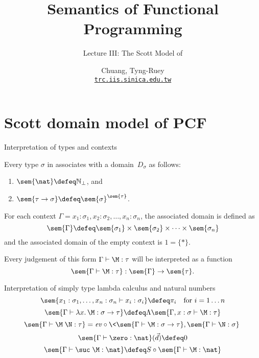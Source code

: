 \title{Semantics of Functional Programming}
\subtitle{Lecture III: The Scott Model of \PCF}
\author[T.-R. Chuang]{Chuang, Tyng-Ruey \\
  \href{mailto@trc.iis.sinica.edu.tw}{\texttt{trc.iis.sinica.edu.tw}}}

\frame{\maketitle}
\section{Scott domain model of PCF}  
\begin{frame}{Interpretation of types and contexts}
  \begin{definition}
  Every type $\sigma$ in \PCF{} associates with a domain~$D_\sigma$ as
  follows:

    \begin{enumerate}
      \item $\sem{\nat} \defeq \mathbb{N}_\bot$, and
      \item $\sem{\tau \to \sigma} \defeq \sem{\sigma}^{\sem{\tau}}$.
    \end{enumerate}
  \end{definition}
  \begin{definition}
    For each context $\Gamma = x_1 : \sigma_1, x_2 : \sigma_2,
    \dots, x_n : \sigma_n$, the associated domain is defined as
    \[
      \sem{\Gamma} \defeq \sem{\sigma_1} \times \sem{\sigma_2}
      \times \dots \times \sem{\sigma_n}
    \]
    and the associated domain of the empty context is $1 = \{*\}$. 
  \end{definition}
  Every judgement of this form $\Gamma \vdash \M : \tau$ will be interpreted as
  a function
  \[
    \sem{\Gamma \vdash \M : \tau} : \sem{\Gamma} \to \sem{\tau}.
  \]
\end{frame}

\begin{frame}{Interpretation of simply type lambda calculus
  and natural numbers}
  \[
    \sem{ x_1 : \sigma_1, \dots, x_n : \sigma_n \vdash
      x_i : \sigma_i } \defeq \pi_i
    \quad\text{for $i = 1 \dots n$}
  \]
  \[ 
    \sem{\Gamma \vdash \lambda x.\, \M : \sigma \to \tau} \defeq
    \Lambda\sem{\Gamma, x : \sigma \vdash \M : \tau}
  \]
  \[
    \sem{\Gamma \vdash \M\;\N : \tau} = \mathit{ev}
    \circ \<\sem{\Gamma \vdash
      \M : \sigma \to \tau}, \sem{\Gamma \vdash \N : \sigma}\>
  \]
  \[
    \sem{\Gamma \vdash \zero : \nat}(\vec{d}) \defeq 0
  \]
  \[
    \sem{\Gamma \vdash \suc\;\M : \nat} \defeq S \circ \sem{\Gamma
      \vdash \M : \nat}
  \]
\end{frame}

